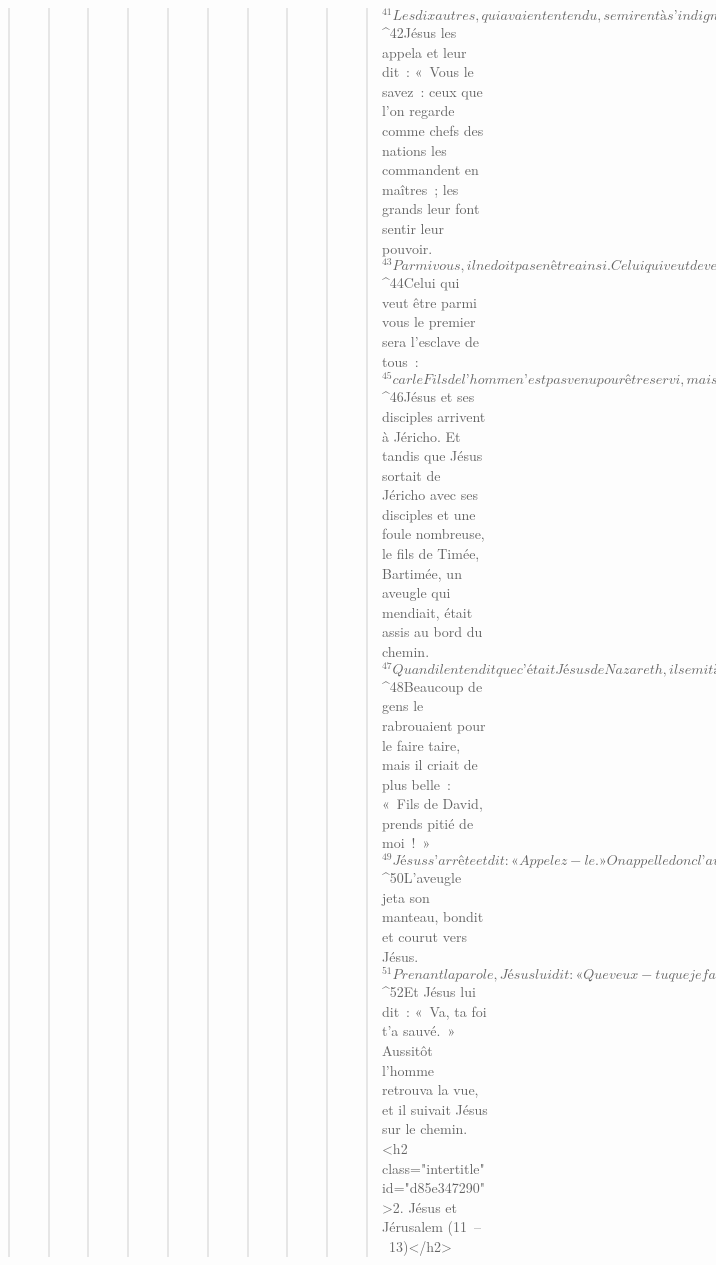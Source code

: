 \begin{verse}
\begin{verse}
\begin{verse}
\begin{verse}
\begin{verse}
\begin{verse}
\begin{verse}
\begin{verse}
\begin{verse}
\begin{verse}
${}^{41}Les dix autres, qui avaient entendu, se mirent à s’indigner contre Jacques et Jean. 
${}^{42}Jésus les appela et leur dit : « Vous le savez : ceux que l’on regarde comme chefs des nations les commandent en maîtres ; les grands leur font sentir leur pouvoir. 
${}^{43}Parmi vous, il ne doit pas en être ainsi. Celui qui veut devenir grand parmi vous sera votre serviteur. 
${}^{44}Celui qui veut être parmi vous le premier sera l’esclave de tous : 
${}^{45}car le Fils de l’homme n’est pas venu pour être servi, mais pour servir, et donner sa vie en rançon pour la multitude. »
${}^{46}Jésus et ses disciples arrivent à Jéricho. Et tandis que Jésus sortait de Jéricho avec ses disciples et une foule nombreuse, le fils de Timée, Bartimée, un aveugle qui mendiait, était assis au bord du chemin. 
${}^{47}Quand il entendit que c’était Jésus de Nazareth, il se mit à crier : « Fils de David, Jésus, prends pitié de moi ! » 
${}^{48}Beaucoup de gens le rabrouaient pour le faire taire, mais il criait de plus belle : « Fils de David, prends pitié de moi ! » 
${}^{49}Jésus s’arrête et dit : « Appelez-le. » On appelle donc l’aveugle, et on lui dit : « Confiance, lève-toi ; il t’appelle. » 
${}^{50}L’aveugle jeta son manteau, bondit et courut vers Jésus. 
${}^{51}Prenant la parole, Jésus lui dit : « Que veux-tu que je fasse pour toi ? » L’aveugle lui dit : « Rabbouni, que je retrouve la vue ! » 
${}^{52}Et Jésus lui dit : « Va, ta foi t’a sauvé. » Aussitôt l’homme retrouva la vue, et il suivait Jésus sur le chemin.
      <h2 class="intertitle" id="d85e347290">2. Jésus et Jérusalem (11 – 13)</h2>
      

\end{verse}
\end{verse}
\end{verse}
\end{verse}
\end{verse}
\end{verse}
\end{verse}
\end{verse}
\end{verse}
\end{verse}
